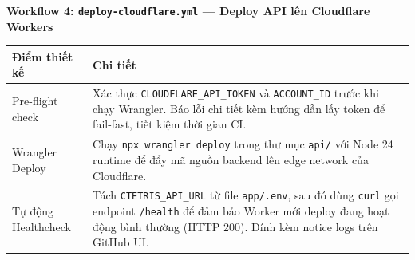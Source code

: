 \documentclass[12pt,a4paper]{article}
\begin{document}
\vspace{6pt}
\noindent\textbf{Workflow 4: \texttt{deploy-cloudflare.yml} --- Deploy API lên Cloudflare Workers}

\begin{center}
\end{center}

\begin{tabularx}{\linewidth}{|l|X|}
  \hline
  \rowcolor{devopsColor!10}
  \textbf{Điểm thiết kế} & \textbf{Chi tiết} \\
  \hline
  Pre-flight check & Xác thực \texttt{CLOUDFLARE\_API\_TOKEN} và \texttt{ACCOUNT\_ID} trước khi chạy Wrangler. Báo lỗi chi tiết kèm hướng dẫn lấy token để fail-fast, tiết kiệm thời gian CI. \\
  \hline
  Wrangler Deploy & Chạy \texttt{npx wrangler deploy} trong thư mục \texttt{api/} với Node 24 runtime để đẩy mã nguồn backend lên edge network của Cloudflare. \\
  \hline
  Tự động Healthcheck & Tách \texttt{CTETRIS\_API\_URL} từ file \texttt{app/.env}, sau đó dùng \texttt{curl} gọi endpoint \texttt{/health} để đảm bảo Worker mới deploy đang hoạt động bình thường (HTTP 200). Đính kèm notice logs trên GitHub UI. \\
  \hline
\end{tabularx}

\label{LastPageTechnologyAdoption}
\end{document}
